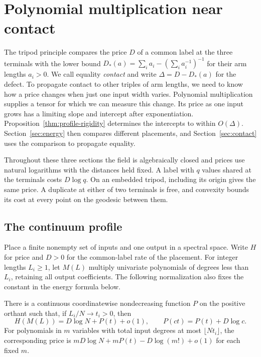 \section{Polynomial multiplication near contact}\label{sec:profiles}

The tripod principle compares the price $D$ of a common label at the
three terminals with the lower bound $D_*(a)=\sum_i a_i-(\sum_i a_i^{-1})^{-1}$
for their arm lengths $a_i>0$. We call equality \emph{contact} and write
$\Delta=D-D_*(a)$ for the defect. To propagate contact to other triples
of arm lengths, we need to know how a price changes when just one input
width varies. Polynomial multiplication supplies a tensor for which we
can measure this change. Its price as one input grows has a limiting slope
and intercept after exponentiation. Proposition~\ref{thm:profile-rigidity}
determines the intercepts to within $O(\Delta)$. Section~\ref{sec:energy}
then compares different placements, and Section~\ref{sec:contact} uses the
comparison to propagate equality.

Throughout these three sections the field is algebraically closed and
prices use natural logarithms with the distances held fixed. A label
with $q$ values shared at the terminals costs $D\log q$. On an embedded
tripod, including its origin gives the same price. A duplicate at either
of two terminals is free, and convexity bounds its cost at every point
on the geodesic between them.

\subsection{The continuum profile}
Place a finite nonempty set of inputs and one output in a spectral space.
Write $H$ for price and $D>0$ for the common-label rate of the placement.
For integer lengths $L_i\ge1$, let $M(L)$ multiply univariate polynomials
of degrees less than $L_i$, retaining all output coefficients. The following
normalization also fixes the constant in the energy formula below.

\begin{lemma}\label{lem:continuum-profile}
There is a continuous coordinatewise nondecreasing function $P$ on the positive
orthant such that, if $L_i/N\to t_i>0$, then
\[
 H(M(L))=D\log N+P(t)+o(1),\qquad P(ct)=P(t)+D\log c.
\]
For polynomials in $m$ variables with total input degrees at most
$\lfloor Nt_i\rfloor$, the corresponding price is
$mD\log N+mP(t)-D\log(m!)+o(1)$ for each fixed $m$.
\end{lemma}

